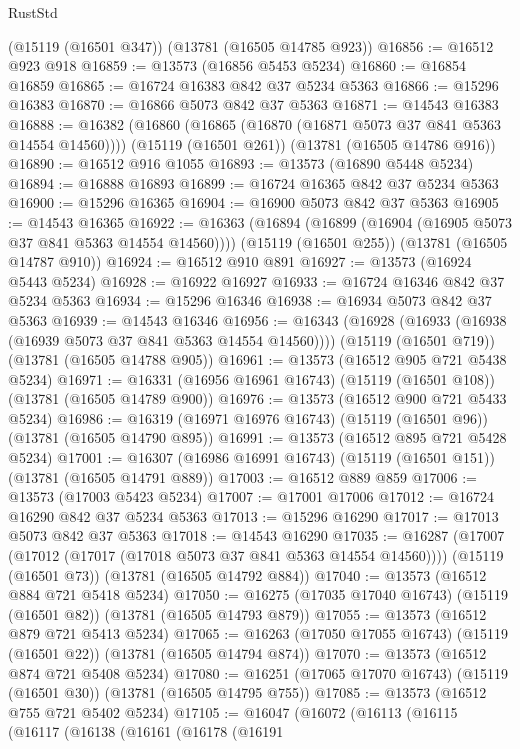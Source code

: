 \begin{lexlean}{RustStd}
\begin{coremodule}
    (@15119 (@16501 @347))
    (@13781 (@16505 @14785 @923))
@16856 := @16512 @923 @918
@16859 := @13573 (@16856 @5453 @5234)
@16860 := @16854 @16859
@16865 := @16724 @16383 @842 @37 @5234 @5363
@16866 := @15296 @16383
@16870 := @16866 @5073 @842 @37 @5363
@16871 := @14543 @16383
@16888 := @16382
    (@16860 (@16865 (@16870 (@16871 @5073 @37 @841 @5363 @14554 @14560))))
    (@15119 (@16501 @261))
    (@13781 (@16505 @14786 @916))
@16890 := @16512 @916 @1055
@16893 := @13573 (@16890 @5448 @5234)
@16894 := @16888 @16893
@16899 := @16724 @16365 @842 @37 @5234 @5363
@16900 := @15296 @16365
@16904 := @16900 @5073 @842 @37 @5363
@16905 := @14543 @16365
@16922 := @16363
    (@16894 (@16899 (@16904 (@16905 @5073 @37 @841 @5363 @14554 @14560))))
    (@15119 (@16501 @255))
    (@13781 (@16505 @14787 @910))
@16924 := @16512 @910 @891
@16927 := @13573 (@16924 @5443 @5234)
@16928 := @16922 @16927
@16933 := @16724 @16346 @842 @37 @5234 @5363
@16934 := @15296 @16346
@16938 := @16934 @5073 @842 @37 @5363
@16939 := @14543 @16346
@16956 := @16343
    (@16928 (@16933 (@16938 (@16939 @5073 @37 @841 @5363 @14554 @14560))))
    (@15119 (@16501 @719))
    (@13781 (@16505 @14788 @905))
@16961 := @13573 (@16512 @905 @721 @5438 @5234)
@16971 := @16331 (@16956 @16961 @16743) (@15119 (@16501 @108)) (@13781 (@16505 @14789 @900))
@16976 := @13573 (@16512 @900 @721 @5433 @5234)
@16986 := @16319 (@16971 @16976 @16743) (@15119 (@16501 @96)) (@13781 (@16505 @14790 @895))
@16991 := @13573 (@16512 @895 @721 @5428 @5234)
@17001 := @16307 (@16986 @16991 @16743) (@15119 (@16501 @151)) (@13781 (@16505 @14791 @889))
@17003 := @16512 @889 @859
@17006 := @13573 (@17003 @5423 @5234)
@17007 := @17001 @17006
@17012 := @16724 @16290 @842 @37 @5234 @5363
@17013 := @15296 @16290
@17017 := @17013 @5073 @842 @37 @5363
@17018 := @14543 @16290
@17035 := @16287
    (@17007 (@17012 (@17017 (@17018 @5073 @37 @841 @5363 @14554 @14560))))
    (@15119 (@16501 @73))
    (@13781 (@16505 @14792 @884))
@17040 := @13573 (@16512 @884 @721 @5418 @5234)
@17050 := @16275 (@17035 @17040 @16743) (@15119 (@16501 @82)) (@13781 (@16505 @14793 @879))
@17055 := @13573 (@16512 @879 @721 @5413 @5234)
@17065 := @16263 (@17050 @17055 @16743) (@15119 (@16501 @22)) (@13781 (@16505 @14794 @874))
@17070 := @13573 (@16512 @874 @721 @5408 @5234)
@17080 := @16251 (@17065 @17070 @16743) (@15119 (@16501 @30)) (@13781 (@16505 @14795 @755))
@17085 := @13573 (@16512 @755 @721 @5402 @5234)
@17105 := @16047
    (@16072
      (@16113
        (@16115
          (@16117
            (@16138
              (@16161
                (@16178
                  (@16191

\end{coremodule}
\end{lexlean}
